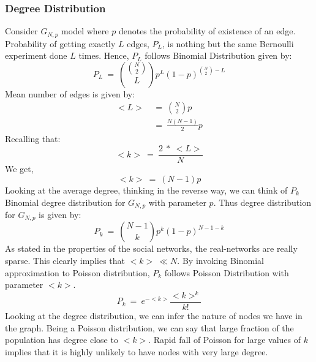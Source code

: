 \documentclass[12pt]{article}
\begin{document}
\subsubsection{Degree Distribution}
Consider $G_{N,p}$ model where $p$ denotes the probability of existence of an edge. Probability of getting exactly $L$ edges, $P_L$, is nothing but the same Bernoulli experiment done $L$ times. Hence, $P_L$ follows Binomial Distribution given by:
\[
P_L ~=~ {{N \choose 2} \choose L}p^L(1 - p)^{{N \choose 2} - L}
\]
Mean number of edges is given by: 
\begin{align*}
<L> ~&=~ {N \choose 2}p \\
	 &=~ \frac{N(N - 1)}{2}p
\end{align*}
Recalling that:
\[
<k> ~=~ \frac{2 ~*~<L>}{N}
\]
We get,
\[
<k> ~=~ (N - 1)p
\]
Looking at the average degree, thinking in the reverse way, we can think of $P_k$ Binomial degree distribution for $G_{N, p}$ with parameter $p$. Thus degree distribution for $G_{N,p}$ is given by:
\begin{equation}
P_k ~=~ {N - 1 \choose k}p^k(1 - p)^{N - 1 - k}
\end{equation}
As stated in the properties of the social networks, the real-networks are really sparse. This clearly implies that $<k> ~\ll N$. By invoking Binomial approximation to Poisson distribution, $P_k$ follows Poisson Distribution with parameter $<k>$.
\begin{equation}
P_k ~=~ e^{-<k>} \frac {<k>^k} {k!}
\end{equation}
Looking at the degree distribution, we can infer the nature of nodes we have in the graph. Being a Poisson distribution, we can say that large fraction of the population has degree close to $<k>$. Rapid fall of Poisson for large values of $k$ implies that it is highly unlikely to have nodes with very large degree.
\end{document}
